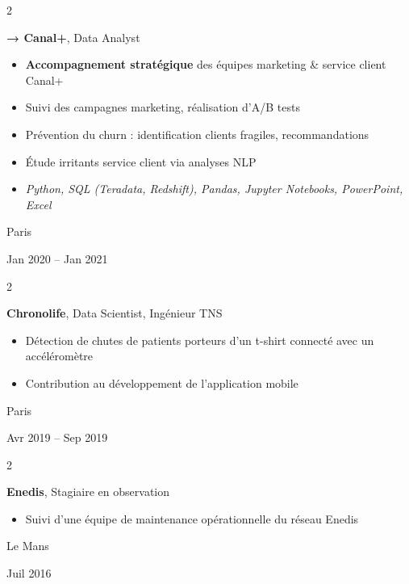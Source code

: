 \documentclass[10pt, letterpaper]{article}
\newenvironment{highlights}{
    \begin{itemize}[
        topsep=0.10 cm,
        parsep=0.10 cm,
        partopsep=0pt,
        itemsep=0pt,
        leftmargin=0.4 cm + 10pt
    ]
}{
    \end{itemize}
} %
\newenvironment{twocolentry}[2][]{
    \onecolentry
    \def\secondColumn{#2}
    \setcolumnwidth{\fill, 3.5 cm}
    \begin{paracol}{2}
}{
    \switchcolumn \raggedleft \secondColumn
    \end{paracol}
    \endonecolentry
} %
\begin{document}
        \vspace{0.2 cm}

        \begin{twocolentry}{
            Paris

        Jan 2020 – Jan 2021
        }
            \textbf{→ Canal+}, Data Analyst
            \begin{highlights}
                \item \textbf{Accompagnement stratégique} des équipes marketing \& service client Canal+
                \item Suivi des campagnes marketing, réalisation d'A/B tests
                \item Prévention du churn : identification clients fragiles, recommandations
                \item Étude irritants service client via analyses NLP
                \item \textit{Python, SQL (Teradata, Redshift), Pandas, Jupyter Notebooks, PowerPoint, Excel}
            \end{highlights}
        \end{twocolentry}


        \vspace{0.2 cm}

        \begin{twocolentry}{
            Paris

        Avr 2019 – Sep 2019
        }
            \textbf{Chronolife}, Data Scientist, Ingénieur TNS
            \begin{highlights}
                \item Détection de chutes de patients porteurs d'un t-shirt connecté avec un accéléromètre
                \item Contribution au développement de l'application mobile
            \end{highlights}
        \end{twocolentry}


        \vspace{0.2 cm}

        \begin{twocolentry}{
            Le Mans

        Juil 2016
        }
            \textbf{Enedis}, Stagiaire en observation
            \begin{highlights}
                \item Suivi d'une équipe de maintenance opérationnelle du réseau Enedis
            \end{highlights}
        \end{twocolentry}
\end{document}
